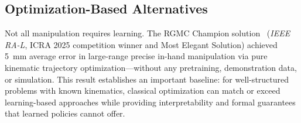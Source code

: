 \subsection{Optimization-Based Alternatives}

Not all manipulation requires learning. The RGMC Champion solution~\cite{yu2025rgmc} (\emph{IEEE RA-L}, ICRA 2025 competition winner and Most Elegant Solution) achieved 5~mm average error in large-range precise in-hand manipulation via pure kinematic trajectory optimization---without any pretraining, demonstration data, or simulation. This result establishes an important baseline: for well-structured problems with known kinematics, classical optimization can match or exceed learning-based approaches while providing interpretability and formal guarantees that learned policies cannot offer.
